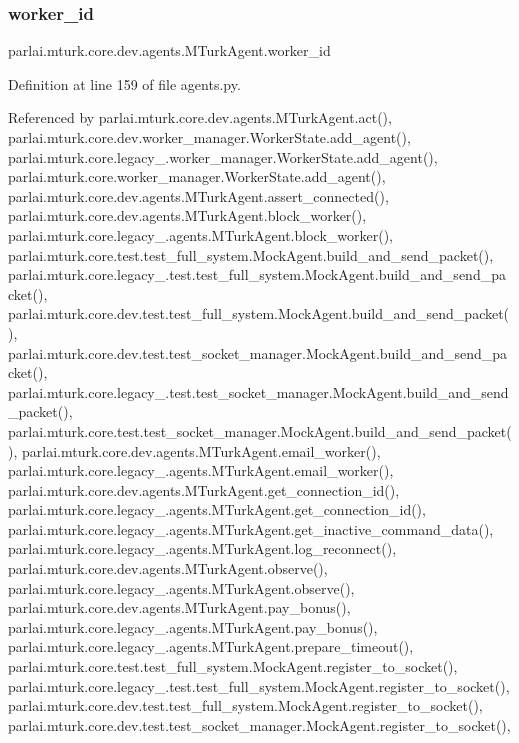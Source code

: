 \subsubsection{\texorpdfstring{worker\+\_\+id}{worker\_id}}
{\footnotesize\ttfamily parlai.\+mturk.\+core.\+dev.\+agents.\+M\+Turk\+Agent.\+worker\+\_\+id}



Definition at line 159 of file agents.\+py.



Referenced by parlai.\+mturk.\+core.\+dev.\+agents.\+M\+Turk\+Agent.\+act(), parlai.\+mturk.\+core.\+dev.\+worker\+\_\+manager.\+Worker\+State.\+add\+\_\+agent(), parlai.\+mturk.\+core.\+legacy\+\_.\+worker\+\_\+manager.\+Worker\+State.\+add\+\_\+agent(), parlai.\+mturk.\+core.\+worker\+\_\+manager.\+Worker\+State.\+add\+\_\+agent(), parlai.\+mturk.\+core.\+dev.\+agents.\+M\+Turk\+Agent.\+assert\+\_\+connected(), parlai.\+mturk.\+core.\+dev.\+agents.\+M\+Turk\+Agent.\+block\+\_\+worker(), parlai.\+mturk.\+core.\+legacy\+\_.\+agents.\+M\+Turk\+Agent.\+block\+\_\+worker(), parlai.\+mturk.\+core.\+test.\+test\+\_\+full\+\_\+system.\+Mock\+Agent.\+build\+\_\+and\+\_\+send\+\_\+packet(), parlai.\+mturk.\+core.\+legacy\+\_.\+test.\+test\+\_\+full\+\_\+system.\+Mock\+Agent.\+build\+\_\+and\+\_\+send\+\_\+packet(), parlai.\+mturk.\+core.\+dev.\+test.\+test\+\_\+full\+\_\+system.\+Mock\+Agent.\+build\+\_\+and\+\_\+send\+\_\+packet(), parlai.\+mturk.\+core.\+dev.\+test.\+test\+\_\+socket\+\_\+manager.\+Mock\+Agent.\+build\+\_\+and\+\_\+send\+\_\+packet(), parlai.\+mturk.\+core.\+legacy\+\_.\+test.\+test\+\_\+socket\+\_\+manager.\+Mock\+Agent.\+build\+\_\+and\+\_\+send\+\_\+packet(), parlai.\+mturk.\+core.\+test.\+test\+\_\+socket\+\_\+manager.\+Mock\+Agent.\+build\+\_\+and\+\_\+send\+\_\+packet(), parlai.\+mturk.\+core.\+dev.\+agents.\+M\+Turk\+Agent.\+email\+\_\+worker(), parlai.\+mturk.\+core.\+legacy\+\_.\+agents.\+M\+Turk\+Agent.\+email\+\_\+worker(), parlai.\+mturk.\+core.\+dev.\+agents.\+M\+Turk\+Agent.\+get\+\_\+connection\+\_\+id(), parlai.\+mturk.\+core.\+legacy\+\_.\+agents.\+M\+Turk\+Agent.\+get\+\_\+connection\+\_\+id(), parlai.\+mturk.\+core.\+legacy\+\_.\+agents.\+M\+Turk\+Agent.\+get\+\_\+inactive\+\_\+command\+\_\+data(), parlai.\+mturk.\+core.\+legacy\+\_.\+agents.\+M\+Turk\+Agent.\+log\+\_\+reconnect(), parlai.\+mturk.\+core.\+dev.\+agents.\+M\+Turk\+Agent.\+observe(), parlai.\+mturk.\+core.\+legacy\+\_.\+agents.\+M\+Turk\+Agent.\+observe(), parlai.\+mturk.\+core.\+dev.\+agents.\+M\+Turk\+Agent.\+pay\+\_\+bonus(), parlai.\+mturk.\+core.\+legacy\+\_.\+agents.\+M\+Turk\+Agent.\+pay\+\_\+bonus(), parlai.\+mturk.\+core.\+legacy\+\_.\+agents.\+M\+Turk\+Agent.\+prepare\+\_\+timeout(), parlai.\+mturk.\+core.\+test.\+test\+\_\+full\+\_\+system.\+Mock\+Agent.\+register\+\_\+to\+\_\+socket(), parlai.\+mturk.\+core.\+legacy\+\_.\+test.\+test\+\_\+full\+\_\+system.\+Mock\+Agent.\+register\+\_\+to\+\_\+socket(), parlai.\+mturk.\+core.\+dev.\+test.\+test\+\_\+full\+\_\+system.\+Mock\+Agent.\+register\+\_\+to\+\_\+socket(), parlai.\+mturk.\+core.\+dev.\+test.\+test\+\_\+socket\+\_\+manager.\+Mock\+Agent.\+register\+\_\+to\+\_\+socket(), 